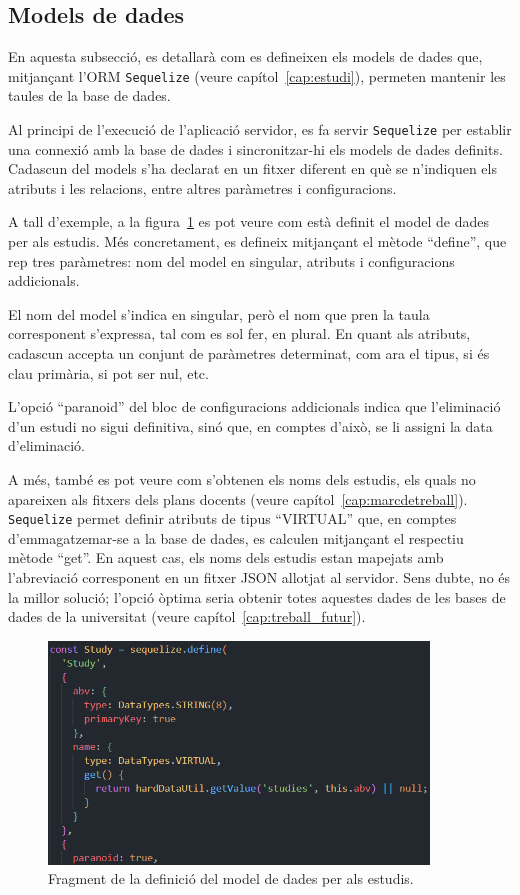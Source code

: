\documentclass[a4paper,12pt]{ThesisStyle}
\begin{document}
\subsection{Models de dades}
\label{subsec:models_dades}

En aquesta subsecció, es detallarà com es defineixen els models de dades que, mitjançant l'ORM \texttt{Sequelize} (veure capítol~\ref{cap:estudi}), permeten mantenir les taules de la base de dades.

Al principi de l'execució de l'aplicació servidor, es fa servir \texttt{Sequelize} per establir una connexió amb la base de dades i sincronitzar-hi els models de dades definits. Cadascun del models s'ha declarat en un fitxer diferent en què se n'indiquen els atributs i les relacions, entre altres paràmetres i configuracions.

A tall d'exemple, a la figura~\ref{img:modelEstudi} es pot veure com està definit el model de dades per als estudis. Més concretament, es defineix mitjançant el mètode ``define'', que rep tres paràmetres: nom del model en singular, atributs i configuracions addicionals.

El nom del model s'indica en singular, però el nom que pren la taula corresponent s'expressa, tal com es sol fer, en plural. En quant als atributs, cadascun accepta un conjunt de paràmetres determinat, com ara el tipus, si és clau primària, si pot ser nul, etc.

L'opció ``paranoid'' del bloc de configuracions addicionals indica que l'eliminació d'un estudi no sigui definitiva, sinó que, en comptes d'això, se li assigni la data d'eliminació.

A més, també es pot veure com s'obtenen els noms dels estudis, els quals no apareixen als fitxers dels plans docents (veure capítol~\ref{cap:marcdetreball}). \texttt{Sequelize} permet definir atributs de tipus ``VIRTUAL'' que, en comptes d'emmagatzemar-se a la base de dades, es calculen mitjançant el respectiu mètode ``get''. En aquest cas, els noms dels estudis estan mapejats amb l'abreviació corresponent en un fitxer JSON allotjat al servidor. Sens dubte, no és la millor solució; l'opció òptima seria obtenir totes aquestes dades de les bases de dades de la universitat (veure capítol~\ref{cap:treball_futur}).

\begin{figure}[H]
  \centering
  \includegraphics[width=0.9\textwidth]{assets/code/modelsDades/modelEstudipng.png}
  \caption{\label{img:modelEstudi} Fragment de la definició del model de dades per als estudis.}
\end{figure}
\end{document}
